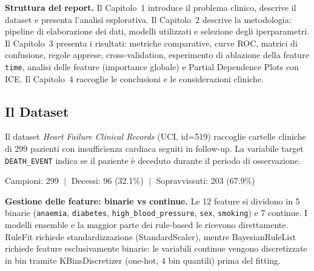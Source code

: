 \documentclass[a4paper,11pt]{article}
\begin{document}
\textbf{Struttura del report.}
Il Capitolo~1 introduce il problema clinico, descrive il dataset e presenta l'analisi esplorativa.
Il Capitolo~2 descrive la metodologia: pipeline di elaborazione dei dati, modelli utilizzati e
selezione degli iperparametri. Il Capitolo~3 presenta i risultati: metriche comparative, curve
ROC, matrici di confusione, regole apprese, cross-validation, esperimento di ablazione della
feature \texttt{time}, analisi delle feature (importance globale) e Partial Dependence Plots
con ICE. Il Capitolo~4 raccoglie le conclusioni e le considerazioni cliniche.

\subsection{Il Dataset}

Il dataset \emph{Heart Failure Clinical Records} (UCI, id=519) raccoglie cartelle cliniche di
299 pazienti con insufficienza cardiaca seguiti in follow-up. La variabile target
\texttt{DEATH\_EVENT} indica se il paziente è deceduto durante il periodo di osservazione.

\medskip
\noindent Campioni: 299 $\;|\;$ Decessi: 96 (32.1\%) $\;|\;$ Sopravvissuti: 203 (67.9\%)

\medskip
\textbf{Gestione delle feature: binarie vs continue.}
Le 12 feature si dividono in 5 binarie (\texttt{anaemia}, \texttt{diabetes},
\texttt{high\_blood\_pressure}, \texttt{sex}, \texttt{smoking}) e 7 continue.
I modelli ensemble e la maggior parte dei rule-based le ricevono direttamente.
RuleFit richiede standardizzazione (StandardScaler), mentre BayesianRuleList richiede feature
esclusivamente binarie: le variabili continue vengono discretizzate in bin tramite
KBinsDiscretizer (one-hot, 4 bin quantili) prima del fitting.
\end{document}
